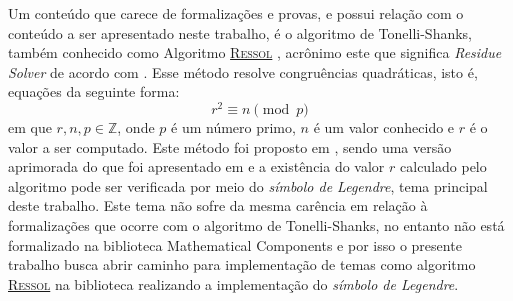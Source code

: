 
Um conteúdo que carece de formalizações e provas, e possui relação com o conteúdo a ser apresentado neste trabalho, é o algoritmo de Tonelli-Shanks, também conhecido como Algoritmo \hyperref[algo:ressol]{\textsc{Ressol}} \cite{Huynh1581080}, acrônimo este que significa \textit{Residue Solver} de acordo com \cite{Niven1915}. Esse método resolve congruências quadráticas, isto é, equações da seguinte forma:
\begin{equation}
    \label{eq:congruenciaquadratica}
    r^2 \equiv n \pmod p
\end{equation}
em que $r, n, p \in \mathbb{Z}$, onde $p$ é um número primo, $n$ é um valor conhecido e $r$ é o valor a ser computado. Este método foi proposto em , sendo uma versão aprimorada do que foi apresentado em \cite{Tonelli1891} e a existência do valor $r$ calculado pelo algoritmo pode ser verificada por meio do \textit{símbolo de Legendre}, tema principal deste trabalho. Este tema não sofre da mesma carência em relação à formalizações que ocorre com o algoritmo de Tonelli-Shanks, no entanto não está formalizado na biblioteca Mathematical Components e por isso o presente trabalho busca abrir caminho para implementação de temas como algoritmo \hyperref[algo:ressol]{\textsc{Ressol}} na biblioteca realizando a implementação do \textit{símbolo de Legendre}.

